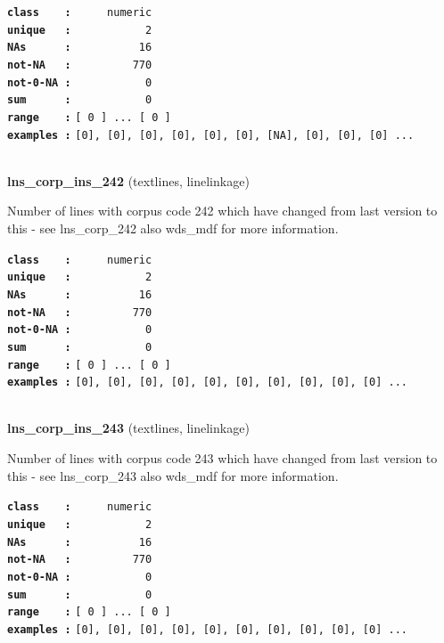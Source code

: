 \documentclass[]{article}
\begin{document}
\textbf{\texttt{class\ \ \ \ :}} \texttt{~~~~~numeric}\\
\textbf{\texttt{unique\ \ \ :}} \texttt{~~~~~~~~~~~2}\\
\textbf{\texttt{NAs\ \ \ \ \ \ :}} \texttt{~~~~~~~~~~16}\\
\textbf{\texttt{not-NA\ \ \ :}} \texttt{~~~~~~~~~770}\\
\textbf{\texttt{not-0-NA\ :}} \texttt{~~~~~~~~~~~0}\\
\textbf{\texttt{sum\ \ \ \ \ \ :}} \texttt{~~~~~~~~~~~0}\\
\textbf{\texttt{range\ \ \ \ :}}
\texttt{{[}\ 0\ {]}\ ...\ {[}\ 0\ {]}}\\
\textbf{\texttt{examples\ :}}
\texttt{{[}0{]},\ {[}0{]},\ {[}0{]},\ {[}0{]},\ {[}0{]},\ {[}0{]},\ {[}NA{]},\ {[}0{]},\ {[}0{]},\ {[}0{]}\ ...}\\

~

\textbf{lns\_corp\_ins\_242} (textlines, linelinkage)

Number of lines with corpus code 242 which have changed from last
version to this - see lns\_corp\_242 also wds\_mdf for more information.

\textbf{\texttt{class\ \ \ \ :}} \texttt{~~~~~numeric}\\
\textbf{\texttt{unique\ \ \ :}} \texttt{~~~~~~~~~~~2}\\
\textbf{\texttt{NAs\ \ \ \ \ \ :}} \texttt{~~~~~~~~~~16}\\
\textbf{\texttt{not-NA\ \ \ :}} \texttt{~~~~~~~~~770}\\
\textbf{\texttt{not-0-NA\ :}} \texttt{~~~~~~~~~~~0}\\
\textbf{\texttt{sum\ \ \ \ \ \ :}} \texttt{~~~~~~~~~~~0}\\
\textbf{\texttt{range\ \ \ \ :}}
\texttt{{[}\ 0\ {]}\ ...\ {[}\ 0\ {]}}\\
\textbf{\texttt{examples\ :}}
\texttt{{[}0{]},\ {[}0{]},\ {[}0{]},\ {[}0{]},\ {[}0{]},\ {[}0{]},\ {[}0{]},\ {[}0{]},\ {[}0{]},\ {[}0{]}\ ...}\\

~

\textbf{lns\_corp\_ins\_243} (textlines, linelinkage)

Number of lines with corpus code 243 which have changed from last
version to this - see lns\_corp\_243 also wds\_mdf for more information.

\textbf{\texttt{class\ \ \ \ :}} \texttt{~~~~~numeric}\\
\textbf{\texttt{unique\ \ \ :}} \texttt{~~~~~~~~~~~2}\\
\textbf{\texttt{NAs\ \ \ \ \ \ :}} \texttt{~~~~~~~~~~16}\\
\textbf{\texttt{not-NA\ \ \ :}} \texttt{~~~~~~~~~770}\\
\textbf{\texttt{not-0-NA\ :}} \texttt{~~~~~~~~~~~0}\\
\textbf{\texttt{sum\ \ \ \ \ \ :}} \texttt{~~~~~~~~~~~0}\\
\textbf{\texttt{range\ \ \ \ :}}
\texttt{{[}\ 0\ {]}\ ...\ {[}\ 0\ {]}}\\
\textbf{\texttt{examples\ :}}
\texttt{{[}0{]},\ {[}0{]},\ {[}0{]},\ {[}0{]},\ {[}0{]},\ {[}0{]},\ {[}0{]},\ {[}0{]},\ {[}0{]},\ {[}0{]}\ ...}\\
\end{document}
